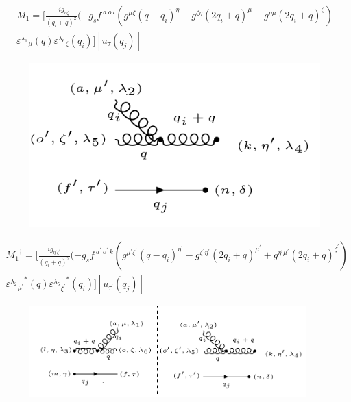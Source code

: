\begin{equation}
\begin{split}
M_1=[\frac{-ig_{{\eta}{\zeta}}}{(q_i +q)^2}(-g_s f^{\:a\:o\:l}(g^{{\mu}{\zeta}}(q-q_i)^{\eta}-g^{{\zeta}{\eta}}(2q_i +q)^{\mu}+g^{{\eta}{\mu}}(2q_i +q)^{\zeta})\\
{\varepsilon^{\lambda_1}}_{\mu} (q) {\varepsilon^{\lambda_6}}_{\zeta} (q_i)][\bar{u}_{\tau}(q_j)]
\end{split}
\end{equation}
\begin{figure}[ht!]
\centering
\includegraphics[scale=0.7]{images/ggqM1dagger.png}
\end{figure}
\begin{equation}
\begin{split}
{M_1}^{\dagger}=[\frac{ig_{{{\eta}^{\prime}}{{\zeta}^{\prime}}}}{(q_i +q)^2}(-g_s f^{\:a^{\prime}\:o^{\prime}\:k}(g^{{{\mu}^{\prime}}{{\zeta}^{\prime}}}(q-q_i)^{{\eta}^{\prime}}-g^{{{\zeta}^{\prime}}{{\eta}^{\prime}}}(2q_i +q)^{{\mu}^{\prime}}+g^{{{\eta}^{\prime}}{{\mu}^{\prime}}}(2q_i +q)^{{\zeta}^{\prime}})\\
{{\varepsilon^{\lambda_2}}_{{\mu}^{\prime}}}^* (q) {{\varepsilon^{\lambda_5}}_{{\zeta}^{\prime}}}^* (q_i)][{u}_{{\tau}^{\prime}}(q_j)]
\end{split}
\end{equation}
\begin{figure}[ht!]
\centering
\includegraphics[width=0.95\textwidth]{images/ggqM1squer.png}
\end{figure}

